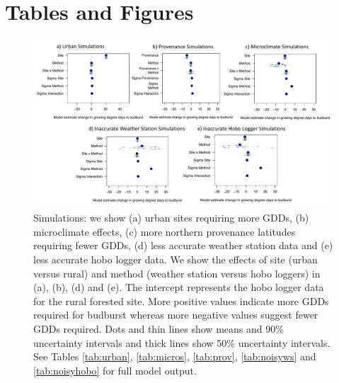 \documentclass{article}\usepackage[]{graphicx}\usepackage[]{color}
\begin{document}


\section*{Tables and Figures}

\begin{figure}[H]
      \centering
      \includegraphics[width=16cm]{..//analyses/figures/muplot_sims.pdf}
\caption{ Simulations: we show (a) urban sites requiring more GDDs, (b) microclimate effects, (c) more northern provenance latitudes requiring fewer GDDs, (d) less accurate weather station data and (e) less accurate hobo logger data. We show the effects of site (urban versus rural) and method (weather station versus hobo loggers) in (a), (b), (d) and (e). The intercept represents the hobo logger data for the rural forested site. More positive values indicate more GDDs required for budburst whereas more negative values suggest fewer GDDs required. Dots and thin lines show means and 90\% uncertainty intervals and thick lines show 50\% uncertainty intervals. See Tables \ref{tab:urban}, \ref{tab:micros}, \ref{tab:prov}, \ref{tab:noisyws} and \ref{tab:noisyhobo} for full model output. } 
\label{fig:musims}
\end{figure}
\end{document}
